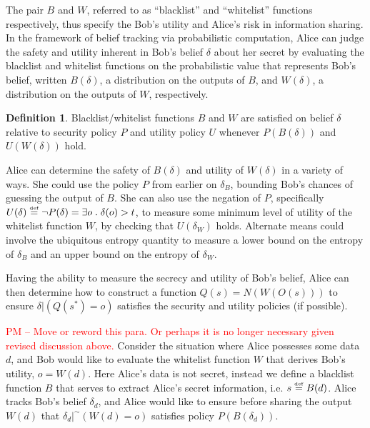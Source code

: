 \documentclass{article} %
\newcommand{\pxm}[1]{\textcolor{red}{PM -- #1}}
\newcommand{\asecret}[0]{s}
\newcommand{\rsecret}[0]{\asecret^*}
\newcommand{\paren}[1]{\left( #1 \right)}
\newcommand{\cond}[0]{|}
\newcommand{\qsep}[0]{\; . \;}
\newcommand{\stacklabel}[1]{\stackrel{\smash{\scriptscriptstyle \mathrm{#1}}}}
\newcommand{\defeq}{\stacklabel{def}=}
\theoremstyle{plain} %
\theoremstyle{definition} %
\newtheorem*{definition-un}{Definition}
\begin{document}
The pair $ B $ and $ W $, referred to as ``blacklist'' and
``whitelist'' functions respectively, thus specify the Bob's utility
and Alice's risk in information sharing. In the framework of belief
tracking via probabilistic computation, Alice can judge the safety and
utility inherent in Bob's belief $ \delta $ about her secret by
evaluating the blacklist and whitelist functions on the probabilistic
value that represents Bob's belief, written $ B(\delta) $, a
distribution on the outputs of $ B $, and $ W(\delta)$, a distribution
on the outputs of $ W $, respectively.

\begin{definition-un} Blacklist/whitelist functions $ B $ and $ W $
  are satisfied on belief $ \delta $ relative to security policy $ P $
  and utility policy $ U $ whenever $P(B(\delta))$ and $U(W(\delta))$ hold.
\end{definition-un}
Alice can determine the safety of $ B(\delta) $ and utility of $
W(\delta) $ in a variety of ways. She could use the policy $ P $ from
earlier on $ \delta_B $, bounding Bob's chances of guessing the output
of $ B $. She can also use the negation of $ P $, specifically $
U(\delta) \defeq \neg P(\delta) = \exists o \qsep \delta(o) > t $, to
measure some minimum level of utility of the whitelist function $ W $,
by checking that $ U(\delta_W) $ holds. Alternate means could involve
the ubiquitous entropy quantity to measure a lower bound on the
entropy of $ \delta_B $ and an upper bound on the entropy of $
\delta_W $.


Having the ability to measure the secrecy and utility of Bob's belief,
Alice can then determine how to construct a function $ Q(s) =
N(W(O(s))) $ to ensure $ \delta \cond \paren{Q(\rsecret) = o} $
satisfies the security and utility policies (if possible).

\pxm{Move or reword this para. Or perhaps it is no longer necessary
  given revised discussion above.} Consider the situation where Alice
possesses some data $ d $, and Bob would like to evaluate the
whitelist function $ W $ that derives Bob's utility, $ o = W(d)
$. Here Alice's data is not secret, instead we define a blacklist
function $ B $ that serves to extract Alice's secret information,
i.e. $ s \defeq B(d) $. Alice tracks Bob's belief $ \delta_d $, and
Alice would like to ensure before sharing the output $ W(d) $ that
$\delta_d |^\sim (W(d) = o)$ satisfies policy $ P(B(\delta_d)) $.
\end{document}

